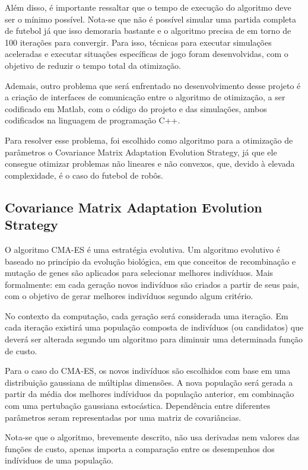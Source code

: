 \documentclass[a4paper,12pt]{article}
\begin{document}
Além disso, é importante ressaltar que o tempo de execução do algoritmo deve ser o mínimo possível. Nota-se que não é possível simular uma partida completa de futebol já que isso demoraria bastante e o algoritmo precisa de em torno de 100 iterações para convergir. Para isso, técnicas para executar simulações aceleradas e executar situações específicas de jogo foram desenvolvidas, com o objetivo de reduzir o tempo total da otimização.

Ademais, outro problema que será enfrentado no desenvolvimento desse projeto é a criação de interfaces de comunicação entre o algoritmo de otimização, a ser codificado em Matlab, com o código do projeto e das simulações, ambos codificados na linguagem de programação C++.

Para resolver esse problema, foi escolhido como algoritmo para a otimização de parâmetros o Covariance Matrix Adaptation Evolution Strategy, já que ele consegue otimizar problemas não lineares e não convexos, que, devido à elevada complexidade, é o caso do futebol de robôs.

\subsection{Covariance Matrix Adaptation Evolution Strategy}

O algoritmo CMA-ES é uma estratégia evolutiva. Um algoritmo evolutivo é baseado no princípio da evolução biológica, em que conceitos de recombinação e mutação de genes são aplicados para selecionar melhores indivíduos. Mais formalmente: em cada geração novos indivíduos são criados a partir de seus pais, com o objetivo de gerar melhores indivíduos segundo algum critério.

No contexto da computação, cada geração será considerada uma iteração. Em cada iteração existirá uma população composta de indivíduos (ou candidatos) que deverá ser alterada segundo um algoritmo para diminuir uma determinada função de custo. 

Para o caso do CMA-ES, os novos indivíduos são escolhidos com base em uma distribuição gaussiana de múltiplas dimensões. A nova população será gerada a partir da média dos melhores indíviduos da população anterior, em combinação com uma pertubação gaussiana estocástica. Dependência entre diferentes parâmetros seram representadas por uma matriz de covariâncias.

Nota-se que o algoritmo, brevemente descrito, não usa derivadas nem valores das funções de custo, apenas importa a comparação entre os desempenhos dos indíviduos de uma população.
\end{document}
